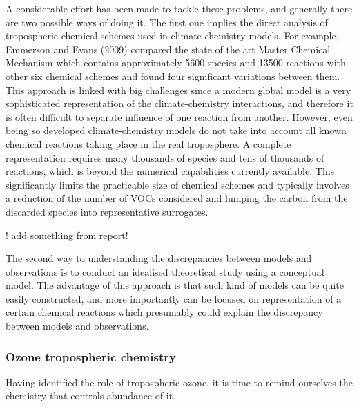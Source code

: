 \documentclass[11pt,a4paper]{article}
\begin{document}
A considerable effort has been made to tackle these problems, and generally there are two possible ways of doing it. The first one implies the direct analysis of tropospheric chemical schemes used in climate-chemistry models. For example, Emmerson and Evans (2009) compared the state of the art Master Chemical Mechanism which contains approximately 5600 species and 13500 reactions \citep{Jenkin2002} with other six chemical schemes and found four significant variations between them. This approach is linked with big challenges since a modern global model is a very sophisticated representation of the climate-chemistry interactions, and therefore it is often difficult to separate influence of one reaction from another. However, even being so developed climate-chemistry models do not take into account all known chemical reactions taking place in the real troposphere. A complete representation requires many thousands of species and tens of thousands of reactions, which is beyond the numerical capabilities currently available. This significantly limits the practicable size of chemical schemes and typically involves a reduction of the number of VOCs considered and lumping the carbon from the discarded species into representative surrogates.

! add something from report!

The second way to understanding the discrepancies between models and observations is to conduct an idealised theoretical study using a conceptual model. The advantage of this approach is that such kind of models can be quite easily constructed, and more importantly can be focused on representation of a certain chemical reactions which presumably could explain the discrepancy between models and observations.

\subsubsection*{Ozone tropospheric chemistry}
%
Having identified the role of tropospheric ozone, it is time to remind ourselves the chemistry that controls abundance of it.
\end{document}
